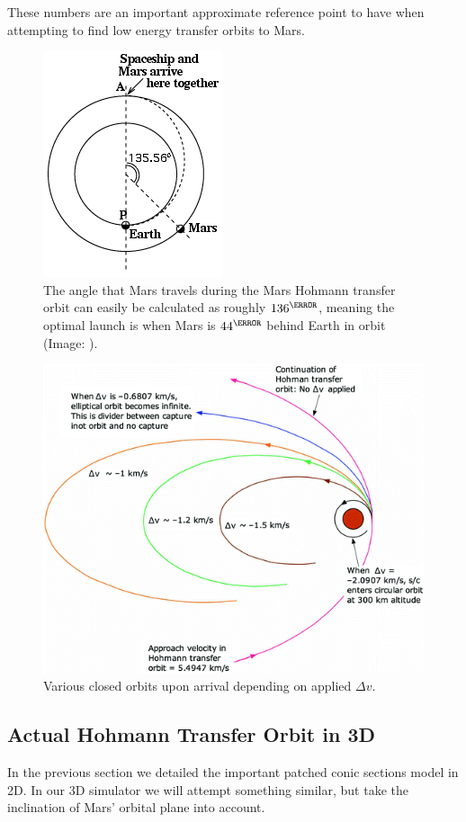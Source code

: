These numbers are an important approximate reference point to have when attempting to find low energy transfer orbits to Mars.

\begin{figure}[ht]
    \centering
    \includegraphics[width=0.35\linewidth]{fig/Hohmann-angle.png}
    \caption{The angle that Mars travels during the Mars Hohmann transfer orbit can easily be calculated as roughly \(136^\degree\), meaning the optimal launch is when Mars is \(44^\degree\) behind Earth in orbit (Image: \cite{Stern}).}
    \label{fig:Hohmann-angle}
\end{figure}

\begin{figure}[ht]
    \centering
    \includegraphics[width=0.85\linewidth]{fig/mars-arrival-orbit.png}
    \caption{Various closed orbits upon arrival depending on applied $\Delta v$.}
    \label{fig:mars-arrival-orbit}
\end{figure}

\clearpage

\subsection{Actual Hohmann Transfer Orbit in 3D}
In the previous section we detailed the important patched conic sections model in 2D. In our 3D simulator we will attempt something similar, but take the inclination of Mars' orbital plane into account.

